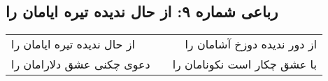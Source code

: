 \begin{center}
\section*{رباعی شماره ۹: از حال ندیده تیره ایامان را}
\label{sec:0009}
\begin{longtable}{l p{0.5cm} r}
از حال ندیده تیره ایامان را
&&
از دور ندیده دوزخ آشامان را
\\
دعوی چکنی عشق دلارامان را
&&
با عشق چکار است نکونامان را
\\
\end{longtable}
\end{center}
